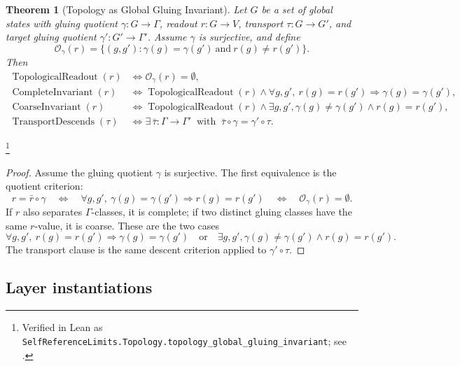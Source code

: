 \documentclass[11pt]{article}
\newtheorem{theorem}{Theorem}[section]
\theoremstyle{definition}
\begin{document}
\begin{theorem}[Topology as Global Gluing Invariant]\label{thm:F48}
Let \(G\) be a set of global states with gluing quotient
\(\gamma:G\to\Gamma\), readout \(r:G\to V\), transport
\(\tau:G\to G'\), and target gluing quotient \(\gamma':G'\to\Gamma'\).
Assume \(\gamma\) is surjective, and define
\[
  \mathcal O_\gamma(r)=
  \{(g,g'):\gamma(g)=\gamma(g')\ \text{and}\ r(g)\ne r(g')\}.
\]
Then
\begin{align*}
  \operatorname{TopologicalReadout}(r)
  &\iff \mathcal O_\gamma(r)=\emptyset,\\
  \operatorname{CompleteInvariant}(r)
  &\iff \operatorname{TopologicalReadout}(r)\wedge
    \forall g,g',\ r(g)=r(g')\Rightarrow \gamma(g)=\gamma(g'),\\
  \operatorname{CoarseInvariant}(r)
  &\iff \operatorname{TopologicalReadout}(r)\wedge
    \exists g,g',\gamma(g)\ne\gamma(g')\wedge r(g)=r(g'),\\
  \operatorname{TransportDescends}(\tau)
  &\iff
    \exists\,\bar\tau:\Gamma\to\Gamma'\ \text{ with }\
    \bar\tau\circ\gamma=\gamma'\circ\tau .
\end{align*}
\end{theorem}
\footnote{\raggedright Verified in Lean as
\texttt{SelfReferenceLimits.\allowbreak{}Topology.\allowbreak{}topology\_global\_gluing\_invariant};
see \Cref{app:formalization}.}
\begin{proof}
Assume the gluing quotient \(\gamma\) is surjective. The first
equivalence is the quotient criterion:
\[
  r=\bar r\circ\gamma
  \quad\Longleftrightarrow\quad
  \forall g,g',\ \gamma(g)=\gamma(g')\Rightarrow r(g)=r(g')
  \quad\Longleftrightarrow\quad
  \mathcal O_\gamma(r)=\emptyset .
\]
If \(r\) also separates \(\Gamma\)-classes, it is complete; if two
distinct gluing classes have the same \(r\)-value, it is coarse. These
are the two cases
\[
  \forall g,g',\ r(g)=r(g')\Rightarrow\gamma(g)=\gamma(g')
  \quad\text{or}\quad
  \exists g,g',\gamma(g)\ne\gamma(g')\wedge r(g)=r(g').
\]
The transport clause is the same descent criterion applied to
\(\gamma'\circ\tau\).
\end{proof}

\subsection*{Layer instantiations}\label{layer-inst:F48}
\end{document}
